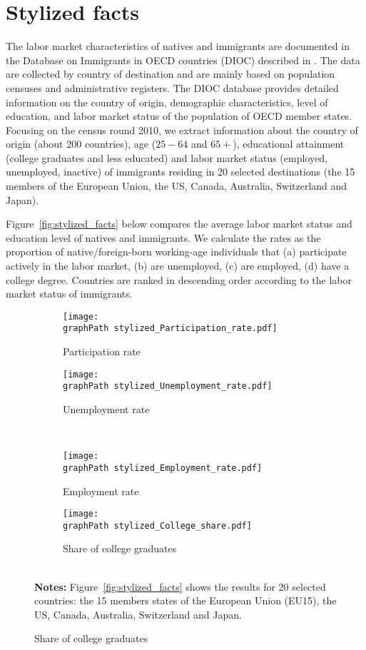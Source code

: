 \documentclass[a4paper,12pt]{article}
\def \graphPath {graphs/}
\begin{document}
\section{Stylized facts} \label{stylized_facts}

The labor market characteristics of natives and immigrants are documented in the Database on Immigrants in OECD countries (DIOC) described in \citet{Arslan2014}. The data are collected by country of destination and are mainly based on population censuses and administrative registers. The DIOC database provides detailed information on the country of origin, demographic characteristics, level of education, and labor market status of the population of OECD member states. Focusing on the census round 2010, we extract information about the country of origin (about 200 countries), age ($25-64$ and $65+$), educational attainment (college graduates and less educated) and labor market status (employed, unemployed, inactive) of immigrants residing in 20 selected destinations (the 15 members of the European Union, the US, Canada, Australia, Switzerland and Japan).

Figure~\ref{fig:stylized_facts} below compares the average labor market status and education level of natives and immigrants. We calculate the rates as the proportion of native/foreign-born working-age individuals that (a) participate actively in the labor market, (b) are unemployed, (c) are employed, (d) have a college degree. Countries are ranked in descending order according to the labor market status of immigrants. 

\begin{figure}[htb!]
\centering
\caption{Labor market status of immigrants and natives in 20 OECD
countries}
\renewcommand{\arraystretch}{0.55}
\label{fig:stylized_facts}
\begin{subfigure}{.45\linewidth}
  \centering
      \caption{Participation rate}
      \label{fig:stylized_facts_a}
  \texttt{[image: \\graphPath stylized\_Participation\_rate.pdf]}
\end{subfigure}%
\begin{subfigure}{.45\linewidth}
  \centering
  \caption{Unemployment rate}
        \label{fig:stylized_facts_b}
  \texttt{[image: \\graphPath stylized\_Unemployment\_rate.pdf]}
\end{subfigure}
\\[0.5cm]
\begin{subfigure}{.45\linewidth}
  \centering
      \caption{Employment rate}
     \label{fig:stylized_facts_c}
  \texttt{[image: \\graphPath stylized\_Employment\_rate.pdf]}
\end{subfigure}%
\begin{subfigure}{.45\linewidth}
  \centering
 \caption{Share of college graduates}
      \label{fig:stylized_facts_d}
  \texttt{[image: \\graphPath stylized\_College\_share.pdf]}
\end{subfigure}
\\[0.5cm]
{\footnotesize \textbf{Notes:} Figure~\ref{fig:stylized_facts} shows the results for 20 selected countries: the 15 members states of the European Union (EU15), the US, Canada, Australia, Switzerland and Japan.}
\end{figure}
\end{document}
